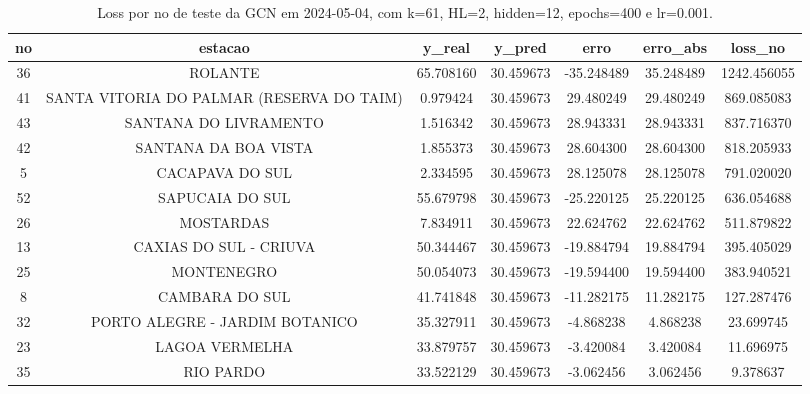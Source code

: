 \begin{table}[h]
\centering
\caption{Loss por no de teste da GCN em 2024-05-04, com k=61, HL=2, hidden=12, epochs=400 e lr=0.001.}
\label{tab:gcn_loss_k61_hl2_h12_e400_d20240504}
\begin{tabular}{ccccccc}
\toprule
no & estacao & y\_real & y\_pred & erro & erro\_abs & loss\_no \\
\midrule
36 & ROLANTE & 65.708160 & 30.459673 & -35.248489 & 35.248489 & 1242.456055 \\
41 & SANTA VITORIA DO PALMAR (RESERVA DO TAIM) & 0.979424 & 30.459673 & 29.480249 & 29.480249 & 869.085083 \\
43 & SANTANA DO LIVRAMENTO & 1.516342 & 30.459673 & 28.943331 & 28.943331 & 837.716370 \\
42 & SANTANA DA BOA VISTA & 1.855373 & 30.459673 & 28.604300 & 28.604300 & 818.205933 \\
5 & CACAPAVA DO SUL & 2.334595 & 30.459673 & 28.125078 & 28.125078 & 791.020020 \\
52 & SAPUCAIA DO SUL & 55.679798 & 30.459673 & -25.220125 & 25.220125 & 636.054688 \\
26 & MOSTARDAS & 7.834911 & 30.459673 & 22.624762 & 22.624762 & 511.879822 \\
13 & CAXIAS DO SUL - CRIUVA & 50.344467 & 30.459673 & -19.884794 & 19.884794 & 395.405029 \\
25 & MONTENEGRO & 50.054073 & 30.459673 & -19.594400 & 19.594400 & 383.940521 \\
8 & CAMBARA DO SUL & 41.741848 & 30.459673 & -11.282175 & 11.282175 & 127.287476 \\
32 & PORTO ALEGRE - JARDIM BOTANICO & 35.327911 & 30.459673 & -4.868238 & 4.868238 & 23.699745 \\
23 & LAGOA VERMELHA & 33.879757 & 30.459673 & -3.420084 & 3.420084 & 11.696975 \\
35 & RIO PARDO & 33.522129 & 30.459673 & -3.062456 & 3.062456 & 9.378637 \\
\bottomrule
\end{tabular}
\end{table}
